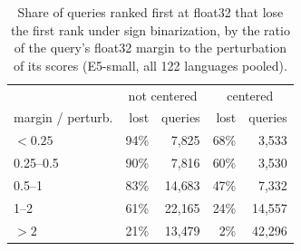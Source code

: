 \begin{table}[t]\centering\footnotesize
\begin{tabular}{lrrrr}
\toprule
 & \multicolumn{2}{c}{not centered} & \multicolumn{2}{c}{centered} \\
margin / perturb. & lost & queries & lost & queries \\
\midrule
$<0.25$ & 94\% & 7{,}825 & 68\% & 3{,}533 \\
0.25--0.5 & 90\% & 7{,}816 & 60\% & 3{,}530 \\
0.5--1 & 83\% & 14{,}683 & 47\% & 7{,}332 \\
1--2 & 61\% & 22{,}165 & 24\% & 14{,}557 \\
$>2$ & 21\% & 13{,}479 & 2\% & 42{,}296 \\
\bottomrule
\end{tabular}
\caption{Share of queries ranked first at float32 that lose the first rank under sign binarization, by the ratio of the query's float32 margin to the perturbation of its scores (E5-small, all 122 languages pooled).}\label{tab:flip}
\end{table}
